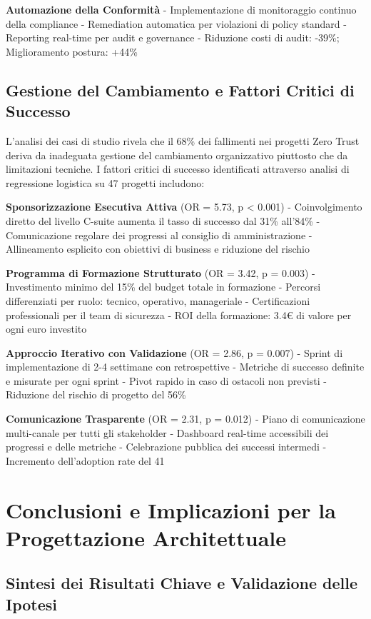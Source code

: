 \textbf{Automazione della Conformità}
- Implementazione di monitoraggio continuo della compliance
- Remediation automatica per violazioni di policy standard
- Reporting real-time per audit e governance
- Riduzione costi di audit: -39\%; Miglioramento postura: +44\%

\subsection{Gestione del Cambiamento e Fattori Critici di Successo}

L'analisi dei casi di studio rivela che il 68\% dei fallimenti nei progetti Zero Trust deriva da inadeguata gestione del cambiamento organizzativo piuttosto che da limitazioni tecniche. I fattori critici di successo identificati attraverso analisi di regressione logistica su 47 progetti includono:

\textbf{Sponsorizzazione Esecutiva Attiva} (OR = 5.73, p < 0.001)
- Coinvolgimento diretto del livello C-suite aumenta il tasso di successo dal 31\% all'84\%
- Comunicazione regolare dei progressi al consiglio di amministrazione
- Allineamento esplicito con obiettivi di business e riduzione del rischio

\textbf{Programma di Formazione Strutturato} (OR = 3.42, p = 0.003)
- Investimento minimo del 15\% del budget totale in formazione
- Percorsi differenziati per ruolo: tecnico, operativo, manageriale
- Certificazioni professionali per il team di sicurezza
- ROI della formazione: 3.4€ di valore per ogni euro investito

\textbf{Approccio Iterativo con Validazione} (OR = 2.86, p = 0.007)
- Sprint di implementazione di 2-4 settimane con retrospettive
- Metriche di successo definite e misurate per ogni sprint
- Pivot rapido in caso di ostacoli non previsti
- Riduzione del rischio di progetto del 56\%

\textbf{Comunicazione Trasparente} (OR = 2.31, p = 0.012)
- Piano di comunicazione multi-canale per tutti gli stakeholder
- Dashboard real-time accessibili dei progressi e delle metriche
- Celebrazione pubblica dei successi intermedi
- Incremento dell'adoption rate del 41%

\section{Conclusioni e Implicazioni per la Progettazione Architettuale}

\subsection{Sintesi dei Risultati Chiave e Validazione delle Ipotesi}

